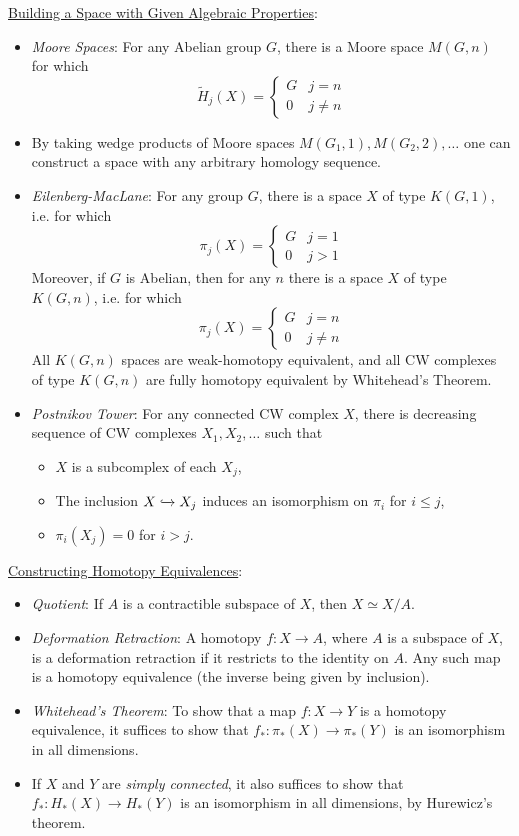 \documentclass{amsart}
\begin{document}
	\underline{Building a Space with Given Algebraic Properties}: 
	\begin{itemize}
		\item \textit{Moore Spaces}: For any Abelian group $G$, there is a Moore space $M(G,n)$ for which
		$$
		\tilde{H}_j(X) = \begin{cases}
			G & j=n\\
			0 & j\neq n
		\end{cases}
		$$
		\item By taking wedge products of Moore spaces $M(G_1,1),M(G_2,2),\dots$ one can construct a space with any arbitrary homology sequence.
		\item \textit{Eilenberg-MacLane}: For any group $G$, there is a space $X$ of type $K(G,1)$, i.e. for which 
		$$
		\pi_j(X) = \begin{cases}
			G & j=1\\
			0 & j>1
		\end{cases}
		$$
		Moreover, if $G$ is Abelian, then for any $n$ there is a space $X$ of type $K(G,n)$, i.e. for which
		$$
		\pi_j(X) = \begin{cases}
			G & j=n\\
			0 & j\neq n
		\end{cases}
		$$
		All $K(G,n)$ spaces are weak-homotopy equivalent, and all CW complexes of type $K(G,n)$ are fully homotopy equivalent by Whitehead's Theorem.
		\item \textit{Postnikov Tower}: For any connected CW complex $X$, there is decreasing sequence of CW complexes $X_1,X_2,\dots$ such that 
		\begin{itemize}
			\item $X$ is a subcomplex of each $X_j$,
			\item The inclusion $X\xhookrightarrow{} X_j$ induces an isomorphism on $\pi_i$ for $i\leq j$,
			\item $\pi_i(X_j)=0$ for $i>j$.\\
		\end{itemize}
	\end{itemize}
	
	\underline{Constructing Homotopy Equivalences}:
	\begin{itemize}
		\item \textit{Quotient}: If $A$ is a contractible subspace of $X$, then $X\simeq X/A$.
		\item \textit{Deformation Retraction}: A homotopy $f:X\to A$, where $A$ is a subspace of $X$, is a deformation retraction if it restricts to the identity on $A$. Any such map is a homotopy equivalence (the inverse being given by inclusion).
		\item \textit{Whitehead's Theorem}: To show that a map $f:X\to Y$ is a homotopy equivalence, it suffices to show that $f_*:\pi_*(X)\to\pi_*(Y)$ is an isomorphism in all dimensions. 
		\item If $X$ and $Y$ are \textit{simply connected}, it also suffices to show that $f_*:H_*(X)\to H_*(Y)$ is an isomorphism in all dimensions, by Hurewicz's theorem.\\
	\end{itemize}
	
\end{document}
